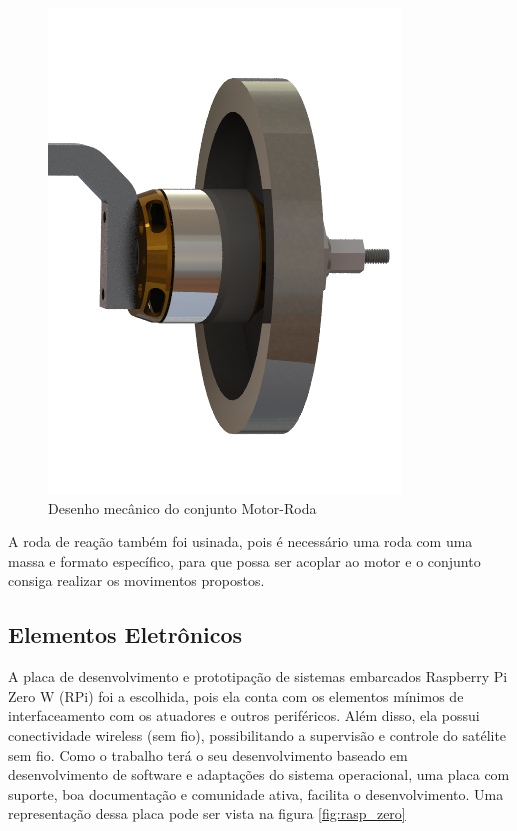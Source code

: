 \begin{figure}[H]
  \caption{Desenho mecânico do conjunto Motor-Roda}
  \begin{center}
      \includegraphics[scale=.45]{metodologia/img/motor_roda_desenho}
  \end{center}
  \label{fig:motor_roda_desenho}
\end{figure}

A roda de reação também foi usinada, pois é necessário uma roda com uma massa e formato específico, para que possa ser acoplar ao motor e o conjunto consiga realizar os movimentos propostos. 



\subsection{Elementos Eletrônicos}

A placa de desenvolvimento e prototipação de sistemas embarcados Raspberry Pi Zero W (RPi) foi a escolhida, pois ela conta com os elementos mínimos de interfaceamento com os atuadores e outros periféricos. Além disso, ela possui conectividade wireless (sem fio), possibilitando a supervisão e controle do satélite sem fio. Como o trabalho terá o seu desenvolvimento baseado em desenvolvimento de software e adaptações do sistema operacional, uma placa com suporte, boa documentação e comunidade ativa, facilita o desenvolvimento. Uma representação dessa placa pode ser vista na figura \ref{fig:rasp_zero}

